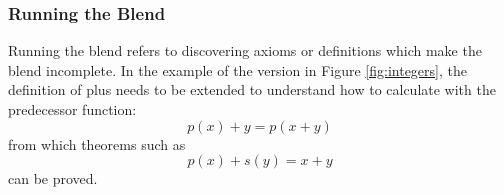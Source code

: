 \subsubsection{Running the Blend}

Running the blend refers to discovering axioms or definitions which
make the blend incomplete. In the example of the version in Figure
\ref{fig:integers}, the definition of plus needs to be extended to
understand how to calculate with the predecessor function:
$$
p(x) + y = p(x+y)
$$
\noindent from which theorems such as 
$$
p(x) + s(y) = x+y
$$
\noindent can be proved.



